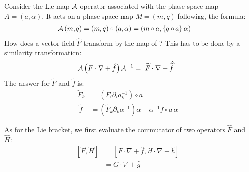 \documentclass{hitec}     %
\begin{document}
{{{{{{Consider the Lie map $\cal A$ operator associated with the phase space map $A=(a,\alpha)$. It acts on a phase space map $M=(m,q)$  following, the formula:    %
%
\begin{align} {\cal A}\left({m,q}\right)&=\left({m,q}\right)\circ \left({a,\alpha }\right)=
\left({m\circ a,\left\{{q\circ a}\right\}\alpha }\right)\label{eq:koopman}\end{align}
%
How does a vector field $\widehat{F}$  transform by the map of ? This has to be done by a similarity transformation:
%
\begin{align} \ {\cal A}\left({F\cdot \nabla +\hat{f}}\right){{\cal A}}^{-1}&=\ \widetilde{F}\cdot \nabla +\hat{\widetilde{f}} \label{aacts}\end{align}
%
The answer for $\widetilde{F}$ and  $\widetilde{f}$ is:
%
\begin{align} {\widetilde{F}}_{k}&=\left({{F}_{i}{\partial }_{i}{a}_{k}^{-1}}\right)\circ a\nonumber \\
 \ \widetilde{f} &=\left({{\widetilde{F}}_{k}{\partial }_{k}{\alpha }^{-1}}\right)\alpha +{\alpha }^{-1}f\circ a\ \alpha  \label{eq:transfgrag}\end{align}


As for the Lie bracket, we first evaluate the commutator of two  operators $\widehat{F}$ and  $\widehat{H}$:
%
\begin{align} \left[{\widehat{F},\widehat{H}}\right]&=\left[{F\cdot \nabla +\hat{f} ,H\cdot \nabla +\hat{h} }\right]\nonumber \\
 &=G\cdot \nabla +\hat{g} \label{hopc}\end{align}
 
}}}}}}
\end{document}
